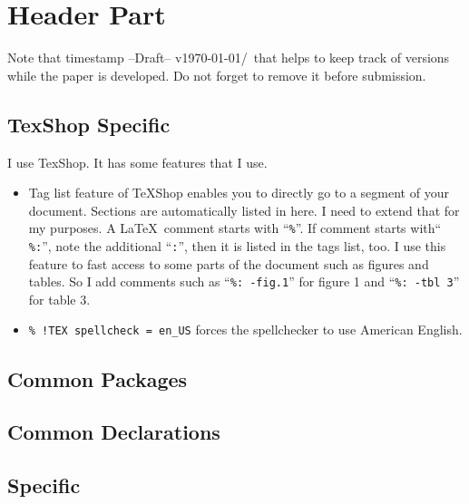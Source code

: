 \documentclass[pre,twocolumn,showkeys,longbibliography]{revtex4-1}
\newcommand{\hbTimeStamp}{{\color{red}--Draft-- v\today/\currenttime}} %
\newcommand{\hbCode}[1]{\texttt{#1}}
\theoremstyle{plain}%
\theoremstyle{definition}
\theoremstyle{remark}
\begin{document}
\section{Header Part}

Note that timestamp \hbTimeStamp\ that helps to keep track of versions while the paper is developed.
Do not forget to remove it before submission.




\subsection{TexShop Specific}

I use TexShop.
It has some features that I use.
\begin{itemize}

	\item
	Tag list feature of TeXShop enables you to directly go to a segment of your document.
	Sections are automatically listed in here.
	I need to extend that for my purposes.
	A \LaTeX\  comment starts with ``\hbCode{\%}''.
	If comment starts with`` \hbCode{\%:}'',
	note the additional ``\hbCode{:}'',
	then it is listed in the tags list, too.
	I use this feature to fast access to some parts of the document such as figures and tables.
	So I add comments such as 
	``\hbCode{\%: -fig.1}'' for figure 1 and
	``\hbCode{\%: -tbl 3}'' for table 3.
	
	\item 
	\hbCode{\% !TEX spellcheck = en\_US} forces the spellchecker to use American English.
	
\end{itemize}





\subsection{Common Packages}




\subsection{Common Declarations}




\subsection{Specific}
\end{document}
